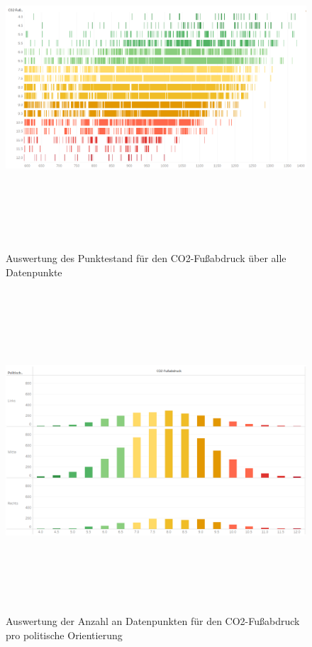 \documentclass[a4paper,12pt]{report}
\begin{document}
\begin{figure}[!h]
    \centering
    \includegraphics[width=16cm,height=12cm]{Diagramme/SZ2_Tab8.PNG}
    \caption{Auswertung des Punktestand für den CO2-Fußabdruck über alle Datenpunkte}
    \label{fig:SZ2Tab8}
\end{figure}

\begin{figure}[!h]
    \centering
    \includegraphics[width=16cm,height=12cm]{Diagramme/SZ2_Tab9.PNG}
    \caption{Auswertung der Anzahl an Datenpunkten für den CO2-Fußabdruck pro politische Orientierung}
    \label{fig:SZ2Tab9}
\end{figure}
\end{document}
